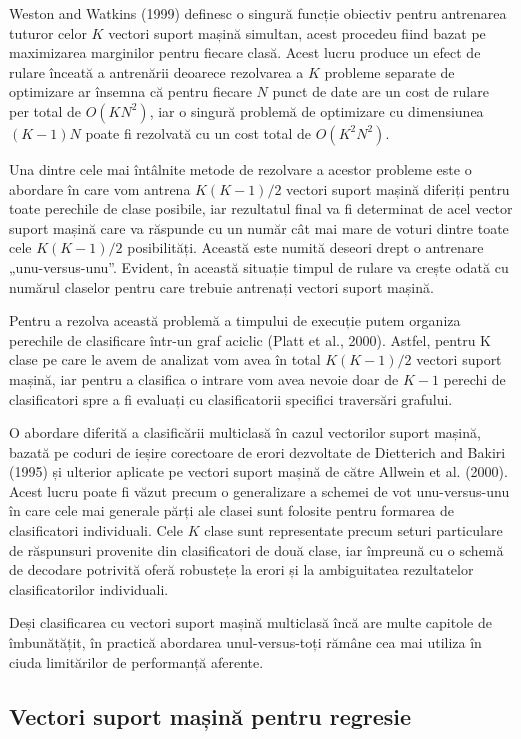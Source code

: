 Weston and Watkins (1999) definesc o singură funcție obiectiv pentru antrenarea tuturor celor $K$ vectori suport mașină simultan, acest procedeu fiind bazat pe maximizarea marginilor pentru fiecare clasă. Acest lucru produce un efect de rulare înceată a antrenării deoarece rezolvarea a $K$ probleme separate de optimizare ar însemna că pentru fiecare $N$ punct de date are un cost de rulare per total de $O(KN^2)$, iar o singură problemă de optimizare cu dimensiunea $(K - 1)N$ poate fi rezolvată cu un cost total de $O(K^2N^2)$.

Una dintre cele mai întâlnite metode de rezolvare a acestor probleme este o abordare în care vom antrena $K(K-1)/2$ vectori suport mașină diferiți pentru toate perechile de clase posibile, iar rezultatul final va fi determinat de acel vector suport mașină care va răspunde cu un număr cât mai mare de voturi dintre toate cele $K(K-1)/2$ posibilități. Această este numită deseori drept o antrenare „unu-versus-unu”. Evident, în această situație timpul de rulare va crește odată cu numărul claselor pentru care trebuie antrenați vectori suport mașină.

Pentru a rezolva această problemă a timpului de execuție putem organiza perechile de clasificare într-un graf aciclic (Platt et al., 2000). Astfel, pentru K clase pe care le avem de analizat vom avea în total $K(K-1)/2$ vectori suport mașină, iar pentru a clasifica o intrare vom avea nevoie doar de $K-1$ perechi de clasificatori spre a fi evaluați cu clasificatorii specifici traversări grafului.

O abordare diferită a clasificării multiclasă în cazul vectorilor suport mașină, bazată pe coduri de ieșire corectoare de erori dezvoltate de Dietterich and Bakiri (1995) și ulterior aplicate pe vectori suport mașină de către Allwein et al. (2000). 
Acest lucru poate fi văzut precum o generalizare a schemei de vot unu-versus-unu în care cele mai generale părți ale clasei sunt folosite pentru formarea de clasificatori individuali.
Cele $K$ clase sunt representate precum seturi particulare de răspunsuri provenite din clasificatori de două clase, iar împreună cu o schemă de decodare potrivită oferă robustețe la erori și la ambiguitatea rezultatelor clasificatorilor individuali.

Deși clasificarea cu vectori suport mașină multiclasă încă are multe capitole de îmbunătățit, în practică abordarea unul-versus-toți rămâne cea mai utiliza în ciuda limitărilor de performanță aferente.

\subsection{Vectori suport mașină pentru regresie}

